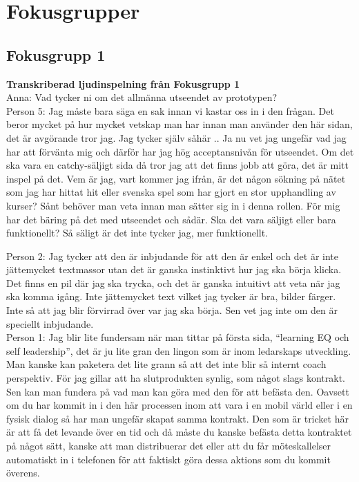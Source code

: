 \onecolumn
\newpage

\appendices
\section{Fokusgrupper}
\subsection{Fokusgrupp 1} 

\textbf{Transkriberad ljudinspelning från Fokusgrupp 1} \\

Anna: Vad tycker ni om det allmänna utseendet av prototypen? \\

Person 5: Jag måste bara säga en sak innan vi kastar oss in i den frågan. Det beror mycket på hur mycket vetskap man har innan man använder den här sidan, det är avgörande tror jag. Jag tycker själv såhär .. Ja nu vet jag ungefär vad jag har att förvänta mig och därför har jag hög acceptansnivån för utseendet. Om det ska vara en catchy-säljigt sida då tror jag att det finns jobb att göra, det är mitt inspel på det. Vem är jag, vart kommer jag ifrån, är det någon sökning på nätet som jag har hittat hit eller svenska spel som har gjort en stor upphandling av kurser? Sånt behöver man veta innan man sätter sig in i denna rollen. För mig har det bäring på det med utseendet och sådär. Ska det vara säljigt eller bara funktionellt? Så säligt är det inte tycker jag, mer funktionellt. 

Person 2: Jag tycker att den är inbjudande för att den är enkel och det är inte jättemycket textmassor utan det är ganska instinktivt hur jag ska börja klicka. Det finns en pil där jag ska trycka, och det är ganska  intuitivt att veta när jag ska komma igång. Inte jättemycket text vilket jag tycker är bra, bilder färger. Inte så att jag blir förvirrad över var jag ska börja. Sen vet jag inte om den är speciellt inbjudande.\\

Person 1: Jag blir lite fundersam när man tittar på första sida, \enquote{learning EQ och self leadership}, det är ju lite gran den lingon som är inom ledarskaps utveckling. Man kanske kan paketera det lite grann så att det inte blir så internt coach perspektiv. För jag gillar att ha slutprodukten synlig, som något slags kontrakt. Sen kan man fundera på vad man kan göra med den för att befästa den. Oavsett om du har kommit in i den här processen inom att vara i en mobil värld eller i en fysisk dialog så har man ungefär skapat samma kontrakt. Den som är tricket här är att få det levande över en tid och då måste du kanske befästa detta kontraktet på något sätt, kanske att man distribuerar det eller att du får möteskallelser automatiskt in i telefonen för att faktiskt göra dessa aktions som du kommit överens. \\

